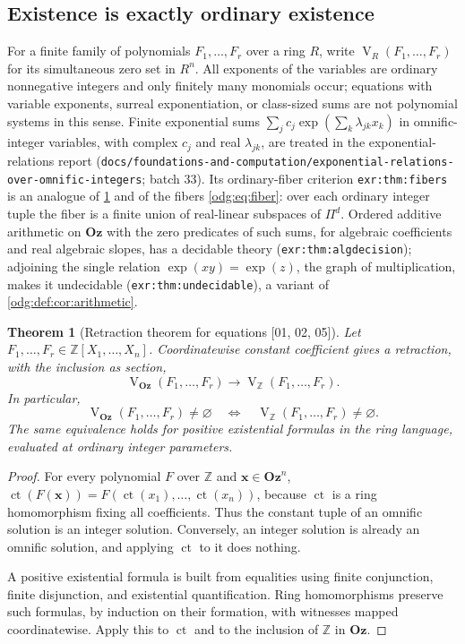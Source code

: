 \documentclass[11pt,oneside]{article}
\numberwithin{equation}{section}
\newtheorem{theorem}{Theorem}[section]
\theoremstyle{definition}
\theoremstyle{remark}
\newcommand{\Oz}{\mathbf{Oz}}
\newcommand{\Z}{\mathbb Z}
\newcommand{\ct}{\operatorname{ct}}
\newcommand{\V}{\operatorname V}
\newcommand{\src}[1]{\textup{\textsf{\small[#1]}}}
\newcommand{\replabel}[1]{\nolinkurl{#1}}
\newcommand{\fn}[1]{\nolinkurl{#1}}
\begin{document}
\subsection{Existence is exactly ordinary existence}

For a finite family of polynomials $F_1,\ldots,F_r$ over a ring $R$, write
$\V_R(F_1,\ldots,F_r)$ for its simultaneous zero set in $R^n$. All
exponents of the variables are ordinary nonnegative integers and only
finitely many monomials occur; equations with variable exponents, surreal
exponentiation, or class-sized sums are not polynomial systems in this sense.
Finite exponential sums $\sum_jc_j\exp(\sum_k\lambda_{jk}x_k)$ in
omnific-integer variables, with complex $c_j$ and real $\lambda_{jk}$, are
treated in the exponential-relations report
(\fn{docs/foundations-and-computation/exponential-relations-over-omnific-integers};
batch 33). Its ordinary-fiber criterion \replabel{exr:thm:fibers} is an
analogue of \cref{odg:thm:transfer} and of the fibers \eqref{odg:eq:fiber}:
over each ordinary integer tuple the fiber is a finite union of real-linear
subspaces of $\Pi^d$. Ordered additive arithmetic on $\Oz$ with the zero
predicates of such sums, for algebraic coefficients and real algebraic
slopes, has a decidable theory (\replabel{exr:thm:algdecision}); adjoining
the single relation $\exp(xy)=\exp(z)$, the graph of multiplication, makes it
undecidable (\replabel{exr:thm:undecidable}), a variant of
\cref{odg:def:cor:arithmetic}.

\begin{theorem}[Retraction theorem for equations \src{01, 02, 05}]\label{odg:thm:transfer}
Let $F_1,\ldots,F_r\in\Z[X_1,\ldots,X_n]$. Coordinatewise constant
coefficient gives a retraction, with the inclusion as section,
\[
 \V_{\Oz}(F_1,\ldots,F_r)\longrightarrow
 \V_\Z(F_1,\ldots,F_r).
\]
In particular,
\begin{equation}\label{odg:eq:existencetransfer}
 \V_{\Oz}(F_1,\ldots,F_r)\ne\varnothing
 \quad\Longleftrightarrow\quad
 \V_\Z(F_1,\ldots,F_r)\ne\varnothing.
\end{equation}
The same equivalence holds for positive existential formulas in the ring
language, evaluated at ordinary integer parameters.
\end{theorem}
\begin{proof}
For every polynomial $F$ over $\Z$ and $\mathbf x\in\Oz^n$,
$\ct(F(\mathbf x))=F(\ct(x_1),\ldots,\ct(x_n))$, because $\ct$ is a ring
homomorphism fixing all coefficients. Thus the constant tuple of an omnific
solution is an integer solution. Conversely, an integer solution is already
an omnific solution, and applying $\ct$ to it does nothing.

A positive existential formula is built from equalities using finite
conjunction, finite disjunction, and existential quantification. Ring
homomorphisms preserve such formulas, by induction on their formation, with
witnesses mapped coordinatewise. Apply this to $\ct$ and to the inclusion of
$\Z$ in $\Oz$.
\end{proof}
\end{document}
